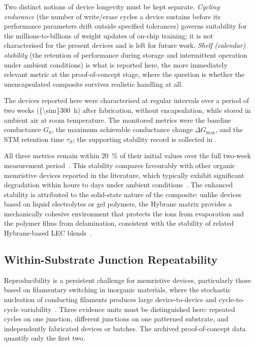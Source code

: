 \documentclass[12pt, twoside]{report}
\begin{document}
Two distinct notions of device longevity must be kept separate. \emph{Cycling endurance} (the number of write/erase cycles a device sustains before its performance parameters drift outside specified tolerances) governs suitability for the millions-to-billions of weight updates of on-chip training; it is not characterised for the present devices and is left for future work. \emph{Shelf (calendar) stability} (the retention of performance during storage and intermittent operation under ambient conditions) is what is reported here, the more immediately relevant metric at the proof-of-concept stage, where the question is whether the unencapsulated composite survives realistic handling at all.

The devices reported here were characterised at regular intervals over a period of two weeks (\SI{{\sim}300}{\hour}) after fabrication, without encapsulation, while stored in ambient air at room temperature. The monitored metrics were the baseline conductance $G_0$, the maximum achievable conductance change $\Delta G_{\mathrm{max}}$, and the STM retention time $\tau_S$; the supporting stability record is collected in .

All three metrics remain within \SI{20}{\percent} of their initial values over the full two-week measurement period~\cite{PradoSocorro2022}. This stability compares favourably with other organic memristive devices reported in the literature, which typically exhibit significant degradation within hours to days under ambient conditions~\cite{Shih2016}. The enhanced stability is attributed to the solid-state nature of the composite: unlike devices based on liquid electrolytes or gel polymers, the Hybrane matrix provides a mechanically cohesive environment that protects the ions from evaporation and the polymer films from delamination, consistent with the stability of related Hybrane-based LEC blends~\cite{Mardegan2021}.

\subsection{Within-Substrate Junction Repeatability}\label{subsec:reproducibility}

Reproducibility is a persistent challenge for memristive devices, particularly those based on filamentary switching in inorganic materials, where the stochastic nucleation of conducting filaments produces large device-to-device and cycle-to-cycle variability~\cite{Sun2019}. Three evidence units must be distinguished here: repeated cycles on one junction, different junctions on one patterned substrate, and independently fabricated devices or batches. The archived proof-of-concept data quantify only the first two.
\end{document}
